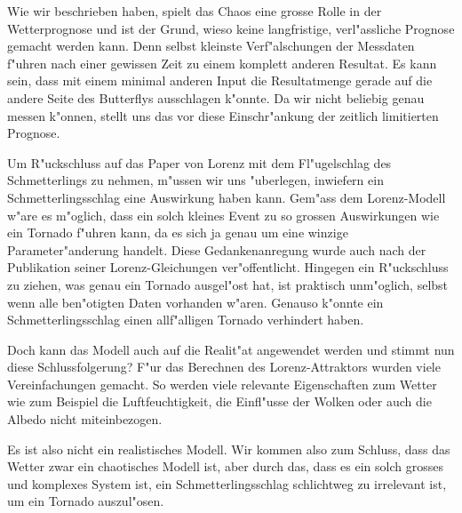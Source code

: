 
Wie wir beschrieben haben, spielt das Chaos eine grosse Rolle in der Wetterprognose und ist der Grund, wieso keine langfristige, verl"assliche Prognose gemacht werden kann. Denn selbst kleinste Verf"alschungen der Messdaten f"uhren nach einer gewissen Zeit zu einem komplett anderen Resultat. Es kann sein, dass mit einem minimal anderen Input die Resultatmenge gerade auf die andere Seite des Butterflys ausschlagen k"onnte. Da wir nicht beliebig genau messen k"onnen, stellt uns das vor diese Einschr"ankung der zeitlich limitierten Prognose.

Um R"uckschluss auf das Paper von Lorenz mit dem Fl"ugelschlag des Schmetterlings zu nehmen, m"ussen wir uns "uberlegen, inwiefern ein Schmetterlingsschlag eine Auswirkung haben kann. Gem"ass dem Lorenz-Modell w"are es m"oglich, dass ein solch kleines Event zu so grossen Auswirkungen wie ein Tornado f"uhren kann, da es sich ja genau um eine winzige Parameter"anderung handelt. Diese Gedankenanregung wurde auch nach der Publikation seiner Lorenz-Gleichungen ver"offentlicht. Hingegen ein R"uckschluss zu ziehen, was genau ein Tornado ausgel"ost hat, ist praktisch unm"oglich, selbst wenn alle ben"otigten Daten vorhanden w"aren. Genauso k"onnte ein Schmetterlingsschlag einen allf"alligen Tornado verhindert haben.

Doch kann das Modell auch auf die Realit"at angewendet werden und stimmt nun diese Schlussfolgerung? F"ur das Berechnen des Lorenz-Attraktors wurden viele Vereinfachungen gemacht. So werden viele relevante Eigenschaften zum Wetter wie zum Beispiel die Luftfeuchtigkeit, die Einfl"usse der Wolken oder auch die Albedo nicht miteinbezogen. 

Es ist also nicht ein realistisches Modell. Wir kommen also zum Schluss, dass das Wetter zwar ein chaotisches Modell ist, aber durch das, dass es ein solch grosses und komplexes System ist, ein Schmetterlingsschlag schlichtweg zu irrelevant ist, um ein Tornado auszul"osen. 